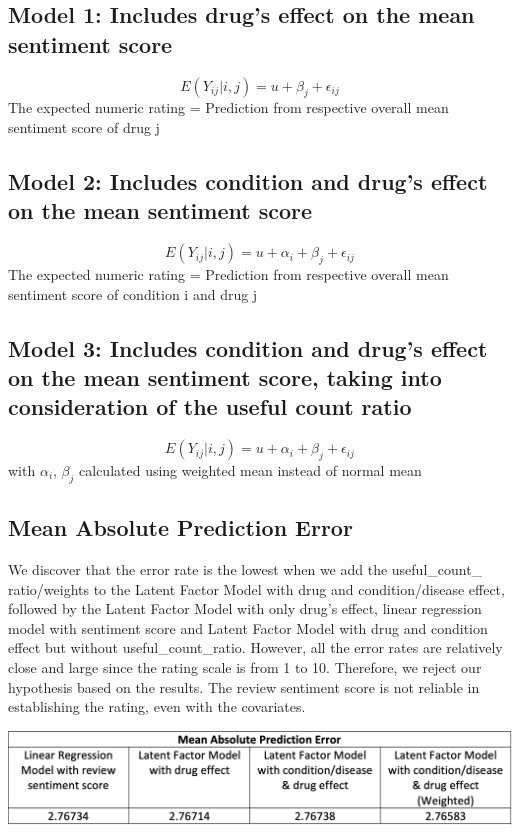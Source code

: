 \documentclass{article}
\begin{document}
\subsection{Model 1: Includes drug’s effect on the mean sentiment score}
\[E(Y_{ij}|i, j) = u + \beta_j + \epsilon_{ij}\]
The expected numeric rating  =  Prediction from respective overall mean sentiment score of drug j 
\subsection{Model 2: Includes condition and drug’s effect on the mean sentiment score}
\[E(Y_{ij}|i, j) = u + \alpha_i + \beta_j + \epsilon_{ij}\]
The expected numeric rating  = Prediction from respective overall mean sentiment score of condition i and drug j 
\subsection{Model 3: Includes condition and drug’s effect on the mean sentiment score, taking into consideration of the useful count ratio}
\[E(Y_{ij}|i, j) = u + \alpha_i + \beta_j + \epsilon_{ij}\]
with \(\alpha_i\), \(\beta_j\) calculated using weighted mean instead of normal mean
\subsection{Mean Absolute Prediction Error}
We discover that the error rate is the lowest when we add the useful\_count\_ 
ratio/weights to the Latent Factor Model with drug and condition/disease 
effect, followed by the Latent Factor Model with only drug’s effect, 
linear regression model with sentiment score and Latent Factor Model with 
drug and condition effect but without useful\_count\_ratio. However, all the error rates are relatively 
close and large since the rating scale is from 1 to 10. Therefore, we reject our hypothesis based on
the results. The review sentiment score is not reliable in 
establishing the rating, even with the covariates.  \newline

\includegraphics[scale=0.3]{mape_problemB.png}
\end{document}
